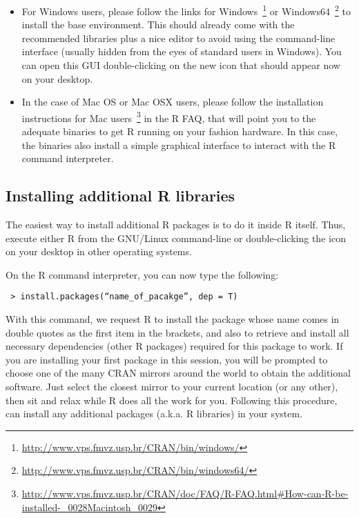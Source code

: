 \begin{itemize}
 \item For Windows users, please follow the links for 
Windows~\footnote{\url{http://www.vps.fmvz.usp.br/CRAN/bin/windows/}} or 
Windows64~\footnote{\url{http://www.vps.fmvz.usp.br/CRAN/bin/windows64/}} to 
install the base environment. This should already come with the recommended 
libraries plus a nice editor to avoid using the command-line interface (usually 
hidden from the eyes of standard users in Windows). You can open this GUI 
double-clicking on the new icon that should appear now on your desktop.

 \item In the case of Mac OS or Mac OSX users, please follow the installation 
instructions for Mac 
users~\footnote{\url{http://www.vps.fmvz.usp.br/CRAN/doc/FAQ/R-FAQ.html\#How-can-R-be-installed-\_0028Macintosh\_0029}} 
in the R FAQ, that will point you to the adequate 
binaries to get R running on your fashion hardware. In this case, the binaries 
also install a simple graphical interface to interact with the R command 
interpreter.
\end{itemize}


\subsection{Installing additional R libraries}
The easiest way to install additional R packages is to do it inside R itself. Thus, 
execute either R from the GNU/Linux command-line or double-clicking the icon on 
your desktop in other operating systems.

On the R command interpreter, you can now type the following:

\begin{verbatim}
 > install.packages(“name_of_pacakge”, dep = T)
\end{verbatim}

With this command, we request R to install the package whose name comes in 
double quotes as the first item in the brackets, and also to retrieve and 
install all necessary dependencies (other R packages) required for this package 
to work. If you are installing your first package in this session, you will be 
prompted to choose one of the many CRAN mirrors around the world to obtain the 
additional software. Just select the closest mirror to your current location 
(or any other), then sit and relax while R does all the work for you.
Following this procedure, can install any additional packages 
(a.k.a. R libraries) in your system.

